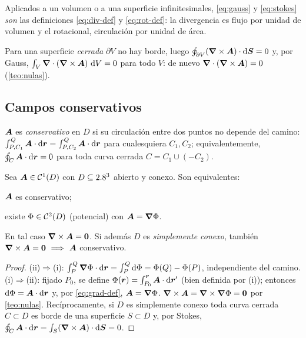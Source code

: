 
\begin{observacion}
Aplicados a un volumen o a una superficie infinitesimales, \eqref{eq:gauss}
y \eqref{eq:stokes} \emph{son} las definiciones \eqref{eq:div-def} y
\eqref{eq:rot-def}: la divergencia es flujo por unidad de volumen y el
rotacional, circulación por unidad de área.
\end{observacion}

\begin{observacion}
Para una superficie \emph{cerrada} $\partial V$ no hay borde, luego
$\oint_{\partial V}(\bm{\nabla}\times\bm{A})\cdot\mathop{}\!\mathrm{d}\bm{S}=0$ y, por Gauss,
$\int_{V}\bm{\nabla}\cdot(\bm{\nabla}\times\bm{A})\,\mathop{}\!\mathrm{d} V=0$ para todo $V$: de nuevo
$\bm{\nabla}\cdot(\bm{\nabla}\times\bm{A})=0$ (\cref{teo:nulas}).
\end{observacion}

\subsection{Campos conservativos}
\label{subsec:conservativos}

\begin{definicion}
$\bm{A}$ es \emph{conservativo} en $D$ si su circulación entre dos puntos
no depende del camino:
$\int_{P,C_{1}}^{Q}\bm{A}\cdot\mathop{}\!\mathrm{d}\bm{r}=\int_{P,C_{2}}^{Q}\bm{A}\cdot\mathop{}\!\mathrm{d}\bm{r}$
para cualesquiera $C_{1},C_{2}$; equivalentemente, $\oint_{C}\bm{A}\cdot\mathop{}\!\mathrm{d}\bm{r}=0$
para toda curva cerrada $C=C_{1}\cup(-C_{2})$.
\end{definicion}

\begin{teorema}
\label{teo:conservativo}
Sea $\bm{A}\in\mathcal{C}^{1}(D)$ con $D\subseteq2.8^{3}$ abierto y conexo. Son
equivalentes:
\begin{casos}
  \item $\bm{A}$ es conservativo;
  \item existe $\Phi\in\mathcal{C}^{2}(D)$ (potencial) con $\bm{A}=\bm{\nabla}\Phi$.
\end{casos}
En tal caso $\bm{\nabla}\times\bm{A}=\bm{0}$. Si además $D$ es \emph{simplemente conexo},
también $\bm{\nabla}\times\bm{A}=\bm{0}\ \Longrightarrow\ \bm{A}$ conservativo.
\end{teorema}

\begin{proof}
(ii)$\Rightarrow$(i): $\int_{P}^{Q}\bm{\nabla}\Phi\cdot\mathop{}\!\mathrm{d}\bm{r}=\int_{P}^{Q}\mathop{}\!\mathrm{d}\Phi=\Phi(Q)-\Phi(P)$,
independiente del camino. (i)$\Rightarrow$(ii): fijado $P_{0}$, se define
$\Phi(\bm{r})=\int_{P_{0}}^{\bm{r}}\bm{A}\cdot\mathop{}\!\mathrm{d}\bm{r}'$ (bien definida por (i)); entonces
$\mathop{}\!\mathrm{d}\Phi=\bm{A}\cdot\mathop{}\!\mathrm{d}\bm{r}$ y, por \eqref{eq:grad-def}, $\bm{A}=\bm{\nabla}\Phi$.
$\bm{\nabla}\times\bm{A}=\bm{\nabla}\times\bm{\nabla}\Phi=\bm{0}$ por \cref{teo:nulas}. Recíprocamente, si
$D$ es simplemente conexo toda curva cerrada $C\subset D$ es borde de una
superficie $S\subset D$ y, por Stokes,
$\oint_{C}\bm{A}\cdot\mathop{}\!\mathrm{d}\bm{r}=\int_{S}(\bm{\nabla}\times\bm{A})\cdot\mathop{}\!\mathrm{d}\bm{S}=0$.
\end{proof}

